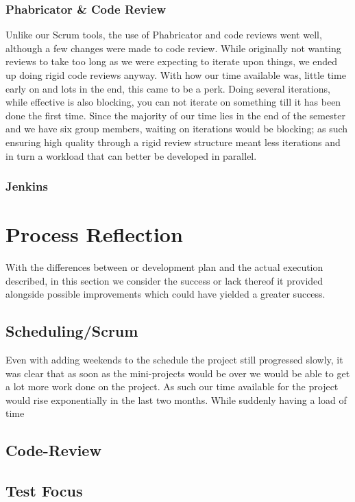 \subsubsection{Phabricator \& Code Review}
Unlike our Scrum tools, the use of Phabricator and code reviews went well, although a few changes were made to code review.
While originally not wanting reviews to take too long as we were expecting to iterate upon things, we ended up doing rigid code reviews anyway.
With how our time available was, little time early on and lots in the end, this came to be a perk.
Doing several iterations, while effective is also blocking, you can not iterate on something till it has been done the first time.
Since the majority of our time lies in the end of the semester and we have six group members, waiting on iterations would be blocking; as such ensuring high quality through a rigid review structure meant less iterations and in turn a workload that can better be developed in parallel.
\subsubsection{Jenkins}
\section{Process Reflection}
With the differences between or development plan and the actual execution described, in this section we consider the success or lack thereof it provided alongside possible improvements which could have yielded a greater success.
\subsection{Scheduling/Scrum}





Even with adding weekends to the schedule the project still progressed slowly, it was clear that as soon as the mini-projects would be over we would be able to get a lot more work done on the project.
As such our time available for the project would rise exponentially in the last two months.
While suddenly having a load of time
\subsection{Code-Review}
\subsection{Test Focus}
\subsection{}
